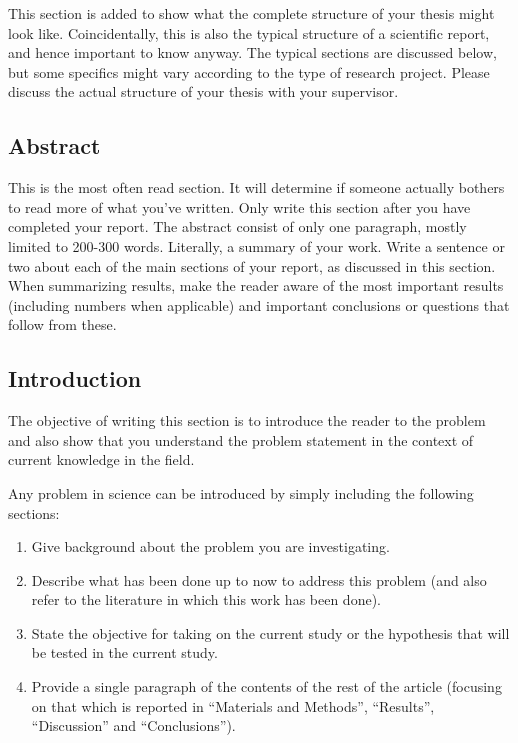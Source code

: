 \documentclass[12pt,a4paper]{article}
\begin{document}
This section is added to show what the complete structure of your thesis
might look like. Coincidentally, this is also the typical structure of a
scientific report, and hence important to know anyway. The typical sections
are discussed below, but some specifics might vary according to the type of
research project. Please discuss the actual structure of your thesis with your
supervisor. 

\subsection{Abstract}
\label{sec:Abstract}
This is the most often read section. It will determine if someone actually
bothers to read more of what you've written. Only write this section after you
have completed your report. The abstract consist of only one paragraph, mostly
limited to 200-300 words. Literally, a summary of your work. Write a sentence
or two about each of the main sections of your report, as discussed in this
section. When summarizing results, make the reader aware of the most important
results (including numbers when applicable) and important conclusions or
questions that follow from these.


\subsection{Introduction}
\label{sec:Introduction}
The objective of writing this section is to introduce the reader to
the problem and also show that you understand the problem statement
in the context of current knowledge in the field.

Any problem in science can be introduced by simply including the following
sections:
\begin{enumerate}
\item Give background about the problem you are investigating. 
\item Describe what has been done up to now to address this problem (and
also refer to the literature in which this work has been done). 
\item State the objective for taking on the current study or the hypothesis
that will be tested in the current study. 
\item Provide a single paragraph of the contents of the rest of the article
(focusing on that which is reported in \textquotedblleft{}Materials and Methods\textquotedblright{},
\textquotedblleft{}Results\textquotedblright{}, \textquotedblleft{}Discussion\textquotedblright{}
and \textquotedblleft{}Conclusions\textquotedblright{}).
\end{enumerate}
\end{document}
